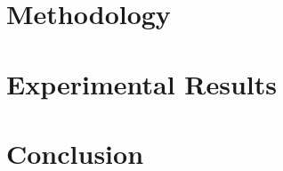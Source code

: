 \documentclass[12pt]{article}
\begin{document}


\section{Methodology}








\section{Experimental Results}








\section{Conclusion}








\end{document}
